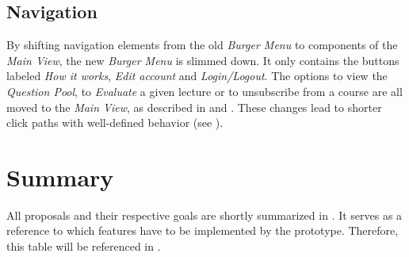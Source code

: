 \subsection{Navigation}
By shifting navigation elements from the old \emph{Burger Menu} to components of the \emph{Main View}, the new \emph{Burger Menu} is slimmed down.
It only contains the buttons labeled \emph{How it works}, \emph{Edit account} and \emph{Login/Logout}. The options to view the \emph{Question Pool}, to \emph{Evaluate} a given lecture or to unsubscribe from a course are all moved to the \emph{Main View}, as described in   and .
These changes lead to shorter click paths with well-defined behavior (see \todogrf).

\section{Summary}
All proposals and their respective goals are shortly summarized in . It serves as a reference to which features have to be implemented by the prototype. Therefore, this table will be referenced in .

